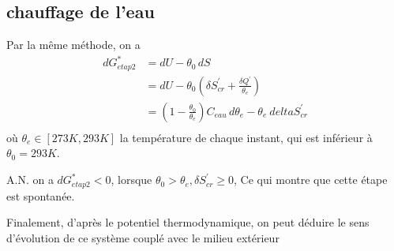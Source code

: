 \documentclass[a4paper,12pt]{book}
\begin{document}
\subsection{chauffage de l'eau}
Par la même méthode, on a 
\begin{align*}
    dG^{*}_{etap2}&=dU-\theta_0\,dS\\
                           &=dU-\theta_0(\delta S^{'}_{cr}+\frac{\delta Q^{'}}{\theta_e})\\
                           &=\left(1-\frac{\theta_0}{\theta_e}\right)C_{eau}\,d\theta_e-\theta_e\ delta S^{'}_{cr}\\
\end{align*}
où $\theta_e\in[273K,293K]$ la température de chaque instant, qui est inférieur à $\theta_0=293K$.

A.N. on a $\boxed{dG^{*}_{etap2}<0}$, lorsque $\theta_0>\theta_e, \delta S_{cr}^{'} \geq 0$, 
Ce qui montre que cette étape est spontanée.


Finalement, d'après  le potentiel thermodynamique, on peut déduire le sens d’évolution de ce système
couplé avec le milieu extérieur
\end{document}
